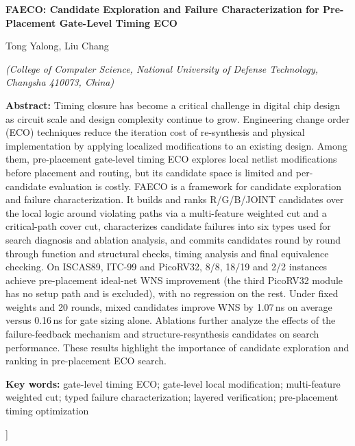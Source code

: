 \documentclass[twocolumn,10pt,fontset=windows]{ctexart}
\begin{document}
\vspace{2pt}
\begin{center}
{\bfseries\fontsize{12.5}{16}\selectfont FAECO: Candidate Exploration and Failure Characterization for Pre-Placement Gate-Level Timing ECO}\par
\vspace{3pt}
{\normalsize Tong Yalong, Liu Chang\par}
\vspace{3pt}
{\small \itshape (College of Computer Science, National University of Defense Technology, Changsha 410073, China)}\par
\vspace{4pt}
\end{center}
\begin{flushleft}
  {\bfseries Abstract:} {\small Timing closure has become a critical challenge in digital chip design as circuit scale and design complexity continue to grow. Engineering change order (ECO) techniques reduce the iteration cost of re-synthesis and physical implementation by applying localized modifications to an existing design. Among them, pre-placement gate-level timing ECO explores local netlist modifications before placement and routing, but its candidate space is limited and per-candidate evaluation is costly. FAECO is a framework for candidate exploration and failure characterization. It builds and ranks R/G/B/JOINT candidates over the local logic around violating paths via a multi-feature weighted cut and a critical-path cover cut, characterizes candidate failures into six types used for search diagnosis and ablation analysis, and commits candidates round by round through function and structural checks, timing analysis and final equivalence checking. On ISCAS89, ITC-99 and PicoRV32, 8/8, 18/19 and 2/2 instances achieve pre-placement ideal-net WNS improvement (the third PicoRV32 module has no setup path and is excluded), with no regression on the rest. Under fixed weights and 20 rounds, mixed candidates improve WNS by 1.07\,ns on average versus 0.16\,ns for gate sizing alone. Ablations further analyze the effects of the failure-feedback mechanism and structure-resynthesis candidates on search performance. These results highlight the importance of candidate exploration and ranking in pre-placement ECO search.}\par
\vspace{3pt}
{\bfseries Key words:} {\small gate-level timing ECO; gate-level local modification; multi-feature weighted cut; typed failure characterization; layered verification; pre-placement timing optimization}\par
\end{flushleft}
]%
\end{document}
